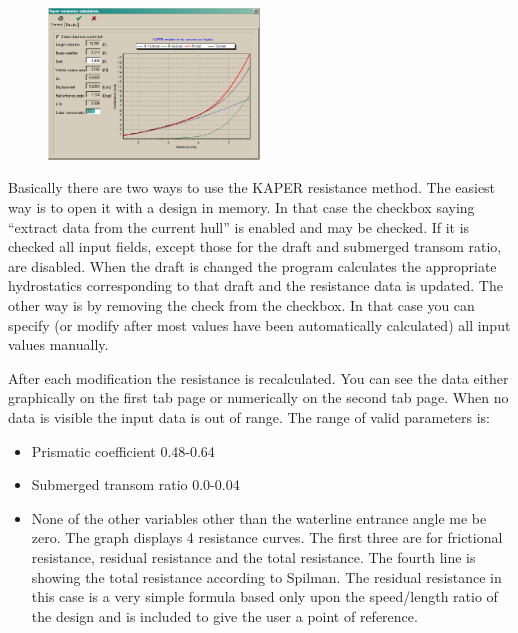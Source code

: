 \documentclass[12pt]{article}
\begin{document}
\begin{figure}
        \centering
        \includegraphics[width=0.5\textwidth,natwidth=536,natheight=384]{kaperdialog.png}
        \caption{}
        \label{fig:kaper}
\end{figure}

Basically there are two ways to use the KAPER resistance method. The
easiest way is to open it with a design in memory. In that case the
checkbox saying “extract data from the current hull” is enabled and
may be checked. If it is checked all input fields, except those for
the draft and submerged transom ratio, are disabled.  When the draft
is changed the program calculates the appropriate hydrostatics
corresponding to that draft and the resistance data is updated. The
other way is by removing the check from the checkbox. In that case you
can specify (or modify after most values have been automatically
calculated) all input values manually.

After each modification the resistance is recalculated. You can see
the data either graphically on the first tab page or numerically on
the second tab page. When no data is visible the input data is out of
range. The range of valid parameters is:

\begin{itemize}

\item Prismatic coefficient 0.48-0.64

\item Submerged transom ratio 0.0-0.04

\item None of the other variables other than the waterline entrance angle me be zero.
The graph displays 4 resistance curves. The first three are for
frictional resistance, residual resistance and the total
resistance. The fourth line is showing the total resistance according
to Spilman. The residual resistance in this case is a very simple
formula based only upon the speed/length ratio of the design and is
included to give the user a point of reference.

\end{itemize}
\end{document}
